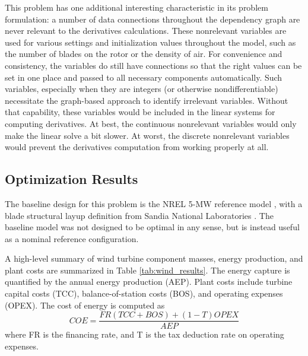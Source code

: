 \documentclass[]{aiaa-tc} %
\begin{document}
    This problem has one additional interesting characteristic in its
    problem formulation: a number of data connections throughout the dependency
    graph are never relevant to the derivatives calculations. These nonrelevant
    variables are used for various settings and initialization values throughout the
    model, such as the number of blades on the rotor or the density of air. For convenience
    and consistency, the variables do still have connections so that the right values can
    be set in one place and passed to all necessary components automatically.
    Such variables, especially when they are integers (or otherwise nondifferentiable)
    necessitate the graph-based approach to identify irrelevant variables. Without that capability, these
    variables would be included in the linear systems for computing derivatives. At best,
    the continuous nonrelevant variables would only make the linear solve a bit slower.
    At worst, the discrete nonrelevant variables would prevent the derivatives computation from working properly at all.


    \subsection{Optimization Results}

    The baseline design for this problem is the NREL 5-MW reference model \cite{Jonkman2009}, with a blade structural layup definition from Sandia National Laboratories \cite{Resor2013}.  The baseline model was not designed to be optimal in any sense, but is instead useful as a nominal reference configuration.

    A high-level summary of wind turbine component masses, energy production, and plant costs are summarized in Table \ref{tab:wind_results}.  The energy capture is quantified by the annual energy production (AEP).  Plant costs include turbine capital costs (TCC), balance-of-station costs (BOS), and operating expenses (OPEX).  The cost of energy is computed as
    \begin{equation}
    COE = \frac {FR (TCC + BOS) + (1-T) OPEX} {AEP}
    \end{equation}
    where FR is the financing rate, and T is the tax deduction rate on operating expenses.
\end{document}
